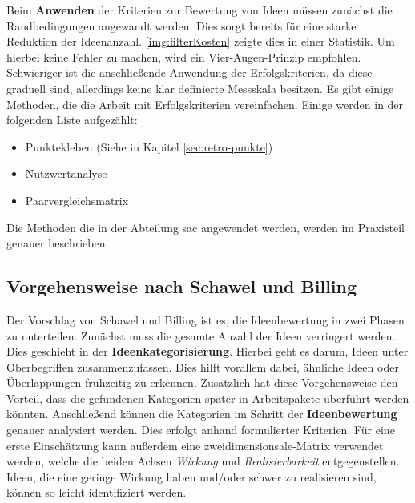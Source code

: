 Beim \textbf{Anwenden} der Kriterien zur Bewertung von Ideen müssen zunächst die Randbedingungen angewandt werden. 
Dies sorgt bereits für eine starke Reduktion der Ideenanzahl. \autoref{img:filterKosten} zeigte dies in einer Statistik. 
Um hierbei keine Fehler zu machen, wird ein Vier-Augen-Prinzip empfohlen. 
Schwieriger ist die anschließende Anwendung der Erfolgskriterien, da diese graduell sind, allerdings keine klar 
definierte Messskala besitzen. 
Es gibt einige Methoden, die die Arbeit mit Erfolgskriterien vereinfachen. Einige werden 
in der folgenden Liste aufgezählt: 
\begin{itemize}
    \item Punktekleben (Siehe in Kapitel \ref{sec:retro-punkte})
    \item Nutzwertanalyse
    \item Paarvergleichsmatrix
\end{itemize}
Die Methoden die in der Abteilung \ac{sac} angewendet werden, werden im Praxisteil genauer beschrieben. \cite{zephram:2018}

\subsection{Vorgehensweise nach Schawel und Billing}
Der Vorschlag von Schawel und Billing ist es, die Ideenbewertung in zwei Phasen zu unterteilen. Zunächst muss die gesamte Anzahl 
der Ideen verringert werden. Dies geschieht in der \textbf{Ideenkategorisierung}. Hierbei geht es darum, Ideen unter 
Oberbegriffen zusammenzufassen. Dies hilft vorallem dabei, ähnliche Ideen oder Überlappungen frühzeitig zu erkennen.
Zusätzlich hat diese Vorgehensweise den Vorteil, dass die gefundenen Kategorien später in Arbeitspakete überführt werden 
könnten. Anschließend können die Kategorien im Schritt der \textbf{Ideenbewertung} genauer analysiert werden. 
Dies erfolgt anhand formulierter Kriterien. Für eine erste Einschätzung kann außerdem eine zweidimensionsale-Matrix verwendet werden, 
welche die beiden Achsen \textit{Wirkung} und \textit{Realisierbarkeit} entgegenstellen. Ideen, die eine geringe Wirkung haben und/oder 
schwer zu realisieren sind, können so leicht identifiziert werden. \cite{schawel:2009}